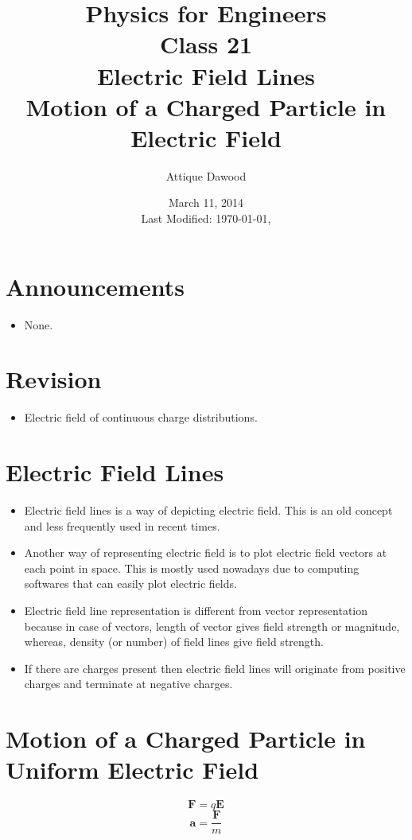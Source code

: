 \documentclass[12pt,a4paper]{article}
\title{\vspace{-3cm}Physics for Engineers\\Class 21\\Electric Field Lines\\Motion of a Charged Particle in Electric Field}
\author{Attique Dawood}
\date{March 11, 2014\\[0.2cm] Last Modified: \today, \currenttime}
\begin{document}
\maketitle
\section{Announcements}
\begin{itemize}
\item None.
\end{itemize}
\section{Revision}
\begin{itemize}
\item Electric field of continuous charge distributions.
\end{itemize}
\section{Electric Field Lines}
\begin{itemize}
\item Electric field lines is a way of depicting electric field. This is an old concept and less frequently used in recent times.
\item Another way of representing electric field is to plot electric field vectors at each point in space. This is mostly used nowadays due to computing softwares that can easily plot electric fields.
\item Electric field line representation is different from vector representation because in case of vectors, length of vector gives field strength or magnitude, whereas, density (or number) of field lines give field strength.
\item If there are charges present then electric field lines will originate from positive charges and terminate at negative charges.
\end{itemize}
\section{Motion of a Charged Particle in Uniform Electric Field}
\begin{equation}
\textbf{F}=q\textbf{E}
\end{equation}
\begin{equation}
\textbf{a}=\dfrac{\textbf{F}}{m}
\end{equation}
\end{document}
